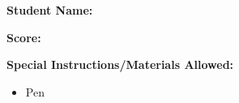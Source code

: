 \documentclass[12pt]{article}
\begin{document}
\vspace{1cm}
\noindent\textbf{Student Name:} \uline{\hspace{8cm}}

\vspace{0.5cm}
\noindent\textbf{Score:} \uline{\hspace{8cm}}

\vspace{0.5cm}
\noindent\textbf{Special Instructions/Materials Allowed:}
\begin{itemize}[leftmargin=*]
    \item Pen
\end{itemize}
\end{document}
